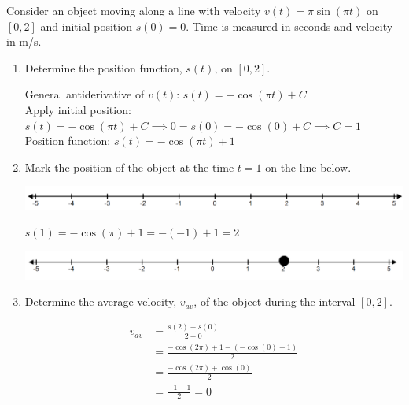 \documentclass[nooutcomes]{ximera}
\begin{document}
\begin{problem}
	
Consider an object moving along a line with velocity $v(t)=\pi \sin(\pi t)$ on $[0,2]$ and initial position $s(0)=0$.  Time is measured in seconds and velocity in m/s.

\begin{enumerate}
	
	\item Determine the position function, $s(t)$, on $[0,2]$.
	
	\begin{freeResponse}	
		General antiderivative of $v(t)$: $s(t)=-\cos(\pi t)+C$\\
		Apply initial position: $s(t)=-\cos(\pi t)+C \implies 0=s(0)=-\cos(0)+C \implies C=1$\\
		Position function: $s(t)=-\cos(\pi t)+1$
	\end{freeResponse}
	
	\item Mark the position of the object at the time $t=1$ on the line below.
	  \begin{image}
    \includegraphics[scale=.4]{figure3.png}
  \end{image}
		\begin{freeResponse}
		$s(1)=-\cos(\pi)+1=-(-1)+1=2$
		  \begin{image}
    \includegraphics[scale=.4]{figure4.png}
  \end{image}
	\end{freeResponse}
	
	\item Determine the average velocity, $v_{av}$, of the object during the interval $[0,2]$.
	
		\begin{freeResponse}	
	\begin{align*}
	v_{av}&=\frac{s(2)-s(0)}{2-0}\\
	&=\frac{-\cos(2\pi)+1-(-\cos(0)+1)}{2}\\
	&=\frac{-\cos(2\pi)+\cos(0)}{2}\\
	&=\frac{-1+1}{2}=0	
	\end{align*}
	\end{freeResponse}
	

\end{enumerate}
\end{problem}
\end{document}
